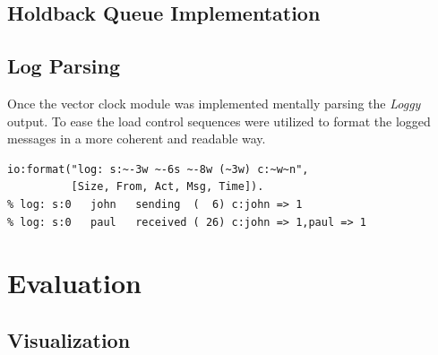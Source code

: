 \documentclass[a4paper, 11pt]{article}
\begin{document}
\subsection{Holdback Queue Implementation}





\subsection{Log Parsing}

Once the vector clock module was implemented mentally parsing the \textit{Loggy} output.
To ease the load control sequences were utilized to format the logged messages in a more coherent and readable way.

\begin{verbatim}
io:format("log: s:~-3w ~-6s ~-8w (~3w) c:~w~n", 
          [Size, From, Act, Msg, Time]).
% log: s:0   john   sending  (  6) c:john => 1
% log: s:0   paul   received ( 26) c:john => 1,paul => 1
\end{verbatim}



\section{Evaluation}


\subsection{Visualization}
\end{document}
